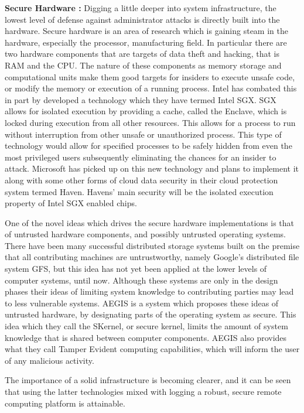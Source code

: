 \textbf{Secure Hardware :} Digging a little deeper into system infrastructure, the lowest level of defense against administrator attacks is directly built into the hardware. Secure hardware is an area of research which is gaining steam in the hardware, especially the processor, manufacturing field. In particular there are two hardware components that are targets of data theft and hacking, that is RAM and the CPU. The nature of these components as memory storage and computational units make them good targets for insiders to execute unsafe code, or modify the memory or execution of a running process. Intel has combated this in part by developed a technology which they have termed Intel SGX.\cite{baumann} SGX allows for isolated execution by providing a cache, called the Enclave, which is locked during execution from all other resources. This allows for a process to run without interruption from other unsafe or unauthorized process. This type of technology would allow for specified processes to be safely hidden from even the most privileged users subsequently eliminating the chances for an insider to attack. Microsoft has picked up on this new technology and plans to implement it along with some other forms of cloud data security in their cloud protection system termed Haven. Havens' main security will be the isolated execution property of Intel SGX enabled chips.\cite{baumann}

One of the novel ideas which drives the secure hardware implementations is that of untrusted hardware components, and possibly untrusted operating systems.\cite{suh} There have been many successful distributed storage systems built on the premise that all contributing machines are untrustworthy, namely Google's distributed file system GFS, but this idea has not yet been applied at the lower levels of computer systems, until now. Although these systems are only in the design phases their ideas of limiting system knowledge to contributing parties may lead to less vulnerable systems. AEGIS is a system which proposes these ideas of untrusted hardware, by designating parts of the operating system as secure. This idea which they call the SKernel, or secure kernel, limits the amount of system knowledge that is shared between computer components.\cite{suh} AEGIS also provides what they call Tamper Evident computing capabilities, which will inform the user of any malicious activity.

The importance of a solid infrastructure is becoming clearer, and it can be seen that using the latter technologies mixed with logging a robust, secure remote computing platform is attainable.

